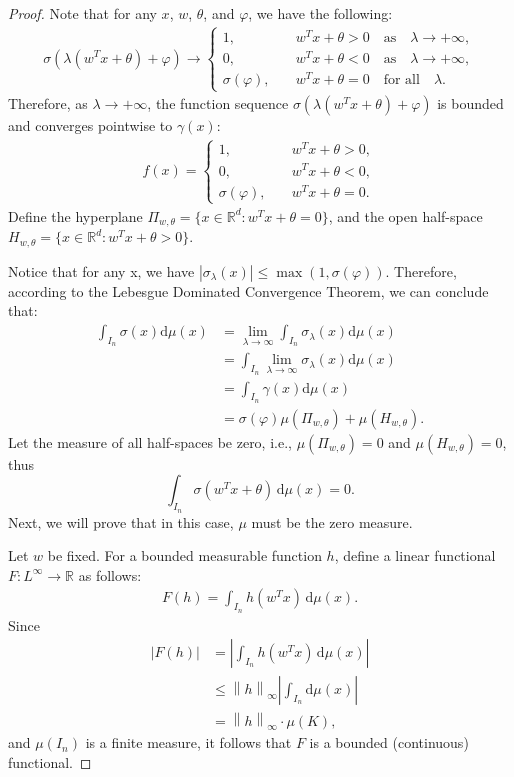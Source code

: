 \documentclass[12pt]{article}
\begin{document}
\begin{proof}
    Note that for any $x$, $w$, $\theta$, and $\varphi$, we have the following:
\begin{align*}
    \sigma(\lambda (w^T x + \theta) + \varphi) \rightarrow 
\begin{cases}
1, &  \quad w^T x + \theta > 0 \quad \text{as} \quad \lambda \to +\infty, \\
0, &  \quad w^T x + \theta < 0 \quad \text{as} \quad \lambda \to +\infty, \\
\sigma(\varphi), & \quad w^T x + \theta = 0 \quad \text{for all} \quad \lambda.
\end{cases}
\end{align*}
Therefore, as $\lambda \to +\infty$, the function sequence $\sigma(\lambda (w^T x + \theta) + \varphi)$ is bounded and converges pointwise to $\gamma(x)$:
\begin{align*}
    f(x) = 
\begin{cases}
1, & \quad w^T x + \theta > 0, \\
0, & \quad w^T x + \theta < 0, \\
\sigma(\varphi), & \quad w^T x + \theta = 0.
\end{cases}
\end{align*}
Define the hyperplane $\Pi_{w,\theta} = \{x \in \mathbb{R}^d : w^T x + \theta = 0\}$, and the open half-space $H_{w,\theta} = \{x \in \mathbb{R}^d : w^T x + \theta > 0\}$.

Notice that for any x, we have $|\sigma_\lambda(x)| \leq \max(1, \sigma(\varphi))$. Therefore, according to the Lebesgue Dominated Convergence Theorem, we can conclude that:
\begin{align*}
    \int_{I_n} \sigma(x)\mathrm{d}\mu(x)&=\lim_{\lambda\to \infty} \int_{I_n} \sigma_\lambda(x)\mathrm{d}\mu(x)\\
    &= \int_{I_n} \lim_{\lambda\to \infty} \sigma_\lambda(x)\mathrm{d}\mu(x)\\
    &=\int_{I_n} \gamma(x) \mathrm{d}\mu(x)\\
    &=\sigma(\varphi)\mu(\Pi_{w,\theta})+\mu(H_{w,\theta}).
\end{align*}
Let the measure of all half-spaces be zero, i.e., $\mu(\Pi_{w,\theta}) = 0$ and $\mu(H_{w,\theta}) = 0$, thus
$$
\int_{I_n} \sigma(w^T x + \theta) \, \mathrm{d}\mu(x) = 0.
$$
Next, we will prove that in this case, $\mu$ must be the zero measure.

Let $w$ be fixed. For a bounded measurable function $h$, define a linear functional $F: L^{\infty} \to \mathbb{R}$ as follows:
\begin{align*}
    F(h) = \int_{I_n} h(w^T x) \, \mathrm{d}\mu(x).
\end{align*}
Since
\begin{align*}
\left|F(h)\right| &= \left|\int_{I_n} h(w^T x) \, \mathrm{d}\mu(x)\right| \\
&\leq {\left\lVert h \right\rVert}_{\infty} \left|\int_{I_n} \mathrm{d}\mu(x)\right| \\
&= {\left\lVert h \right\rVert}_{\infty} \cdot \mu(K),
\end{align*}
and $\mu(I_n)$ is a finite measure, it follows that $F$ is a bounded (continuous) functional.


\end{proof}
\end{document}
